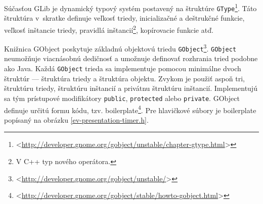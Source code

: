 \documentclass[12pt,oneside,final]{fithesis2}
\begin{document}
Súčasťou GLib je dynamický typový systém postavený na štruktúre 	\texttt{GType}\footnote{<\url{http://developer.gnome.org/gobject/unstable/chapter-gtype.html}>}. Táto štruktúra v~skratke definuje veľkosť triedy, inicializačné a deštrukčné funkcie, veľkosť inštancie triedy, pravidlá inštancií\footnote{V C++ typ nového operátora.}, kopírovacie funkcie atď.

Knižnica GObject poskytuje základnú objektovú triedu \texttt{GObject}\footnote{<\url{http://developer.gnome.org/gobject/unstable/}>}. \texttt{GObject} neumožňuje viacnásobnú dedičnosť a umožnuje definovať rozhrania tried podobne ako Java. Každá \texttt{GObject} trieda sa implementuje pomocou minimálne dvoch štruktúr --- štruktúra triedy a štruktúra objektu. Zvykom je použiť aspoň tri, štruktúru triedy, štruktúru inštancií a privátnu štruktúru inštancií. Implementujú sa tým prístupové modifikátory \texttt{public}, \texttt{protected} alebo \texttt{private}. GObject definuje určitú formu kódu, tzv. boilerplate\footnote{<\url{http://developer.gnome.org/gobject/stable/howto-gobject.html}>}.
Pre hlavičkové súbory je boilerplate popísaný na obrázku \ref{ev-presentation-timer.h}.
\end{document}
